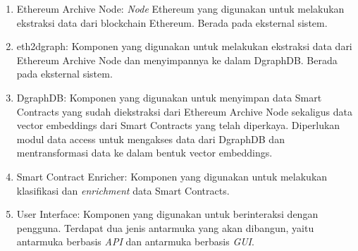 \begin{enumerate}
	\item Ethereum Archive Node: \textit{Node} Ethereum yang digunakan untuk melakukan ekstraksi data dari blockchain Ethereum. Berada pada eksternal sistem.
	\item eth2dgraph: Komponen yang digunakan untuk melakukan ekstraksi data dari Ethereum Archive Node dan menyimpannya ke dalam DgraphDB. Berada pada eksternal sistem.
	\item DgraphDB: Komponen yang digunakan untuk menyimpan data Smart Contracts yang sudah diekstraksi dari Ethereum Archive Node sekaligus data vector embeddings dari Smart Contracts yang telah diperkaya. Diperlukan modul data access untuk mengakses data dari DgraphDB dan mentransformasi data ke dalam bentuk vector embeddings.
	\item Smart Contract Enricher: Komponen yang digunakan untuk melakukan klasifikasi dan \textit{enrichment} data Smart Contracts.
	\item User Interface: Komponen yang digunakan untuk berinteraksi dengan pengguna. Terdapat dua jenis antarmuka yang akan dibangun, yaitu antarmuka berbasis \textit{API} dan antarmuka berbasis \textit{GUI}.
\end{enumerate}







